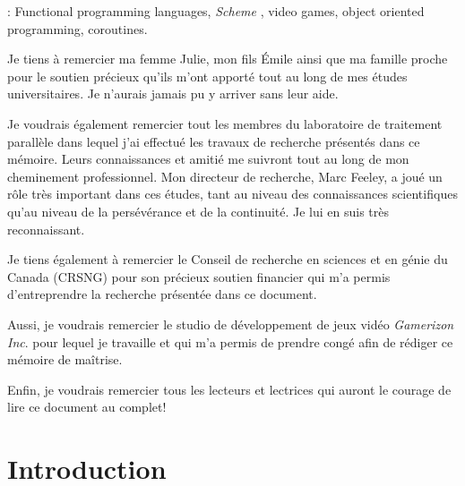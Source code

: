 \documentclass[12pt,twoside,letterpaper,francais]{book}
\newcommand{\Schemelang}{{\textit{Scheme }}}
\begin{document}
\vspace{2em}

: Functional programming languages,
\Schemelang, video games, object oriented programming, coroutines.



 
\tabledesmatieres

\listedestableaux

\listedesfigures


\remerciements

Je tiens à remercier ma femme Julie, mon fils Émile ainsi que ma
famille proche pour le soutien précieux qu'ils m'ont apporté tout au
long de mes études universitaires. Je n'aurais jamais pu y arriver
sans leur aide.

Je voudrais également remercier tout les membres du laboratoire de
traitement parallèle dans lequel j'ai effectué les travaux de
recherche présentés dans ce mémoire. Leurs connaissances et amitié me
suivront tout au long de mon cheminement professionnel. Mon directeur
de recherche, Marc Feeley, a joué un rôle très important dans ces
études, tant au niveau des connaissances scientifiques qu'au niveau de
la persévérance et de la continuité. Je lui en suis très
reconnaissant.

Je tiens également à remercier le Conseil de recherche en sciences et
en génie du Canada (CRSNG) pour son précieux soutien financier qui m'a
permis d'entreprendre la recherche présentée dans ce document.

Aussi, je voudrais remercier le studio de développement de jeux vidéo
\textit{Gamerizon Inc}. pour lequel je travaille et qui m'a permis de
prendre congé afin de rédiger ce mémoire de maîtrise.

Enfin, je voudrais remercier tous les lecteurs et lectrices qui auront
le courage de lire ce document au complet!



\chapter{Introduction} \label{Chap:Intro}
\debutchapitres
\end{document}
